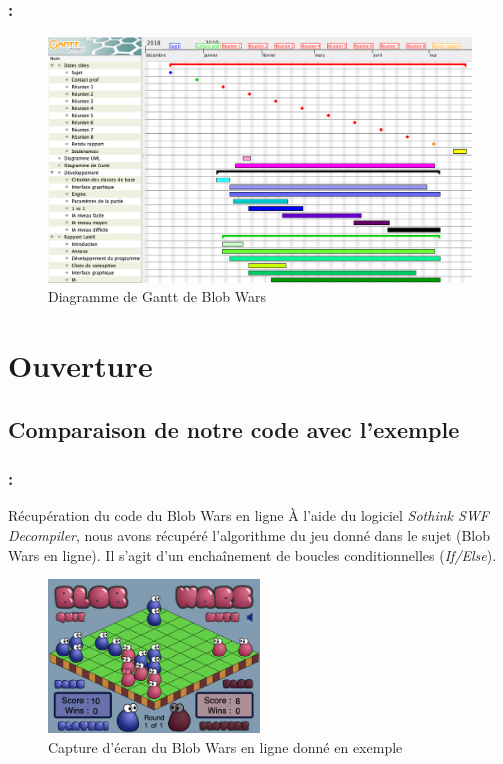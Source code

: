 \documentclass[9pt]{beamer}
\begin{document}
\begin{frame}[fragile]
\frametitle{\insertsectionhead : \insertsubsectionhead}
\begin{figure}[h]
    \begin{center}
        \includegraphics[width=1\textwidth]{figures/gantt.png}
        \vspace{-4px}
        \caption{Diagramme de Gantt de Blob Wars}
    \end{center}
\end{figure}
\end{frame}

\section{Ouverture}

\subsection{Comparaison de notre code avec l'exemple}

\begin{frame}[fragile]
\frametitle{\insertsectionhead : \insertsubsectionhead}
\begin{block}{Récupération du code du Blob Wars en ligne}
À l'aide du logiciel \textit{Sothink SWF Decompiler}, nous avons récupéré l'algorithme du jeu donné dans le sujet (Blob Wars en ligne). Il s'agit d'un enchaînement de boucles conditionnelles (\textit{If/Else}).
\end{block}
\begin{figure}[h]
\begin{center}
\includegraphics[width=0.5\textwidth]{captures/capture_ecran}
\caption{Capture d'écran du Blob Wars en ligne donné en exemple}
\end{center}
\end{figure}
\end{frame}
\end{document}
